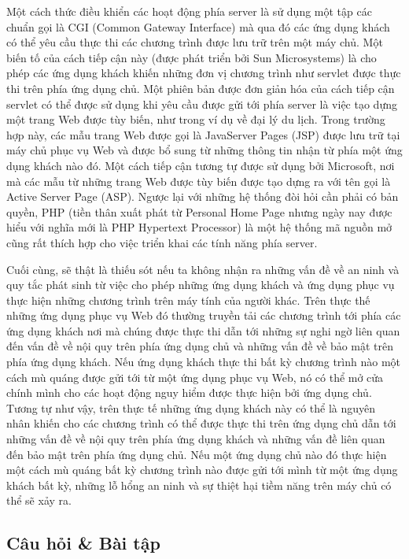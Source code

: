Một cách thức điều khiển các hoạt động phía server là sử dụng một tập các chuẩn gọi là CGI
(Common Gateway Interface) mà qua đó các ứng dụng khách có thể yêu cầu thực thi các chương
trình được lưu trữ trên một máy chủ. Một biến tố của cách tiếp cận này (được phát triển
bởi Sun Microsystems) là cho phép các ứng dụng khách khiến  những đơn vị chương trình
như servlet được thực thi trên phía ứng dụng chủ. Một phiên bản được đơn giản hóa của cách
tiếp cận servlet có thể được sử dụng khi yêu cầu được gửi tới phía server là việc tạo dựng
một trang Web được tùy biến, như trong ví dụ về đại lý du lịch. Trong trường hợp này, các
mẫu trang Web được gọi là JavaServer Pages (JSP) được lưu trữ tại máy chủ phục vụ Web và
được bổ sung từ những thông tin nhận từ phía một ứng dụng khách nào đó. Một cách tiếp cận
tương tự được sử dụng bởi Microsoft, nơi mà các mẫu từ những trang Web được tùy biến được
tạo dựng ra với tên gọi là Active Server Page (ASP). Ngược lại với những hệ thống đòi hỏi
cần phải có bản quyền, PHP (tiền thân xuất phát từ Personal Home Page nhưng ngày nay được
hiểu với nghĩa mới là PHP Hypertext Processor) là một hệ thống mã nguồn mở cũng rất thích hợp cho việc triển
khai các tính năng phía server.

Cuối cùng, sẽ thật là thiếu sót nếu ta không nhận ra những vấn đề về an ninh và 
quy tắc phát sinh từ việc cho phép những ứng dụng khách và ứng dụng phục vụ thực hiện những
chương trình trên máy tính của người khác. Trên thực thế những ứng dụng phục vụ Web đó
thường truyền tải các chương trình tới phía các ứng dụng khách nơi mà chúng được thực thi
dẫn tới những sự nghi ngờ liên quan đến vấn đề về nội quy trên phía ứng dụng chủ và những
vấn đề về bảo mật trên phía ứng dụng khách. Nếu ứng dụng khách thực thi bất kỳ chương
trình nào một cách mù quáng được gửi tới từ một ứng dụng phục vụ Web, nó có thể mở cửa
chính mình cho các hoạt động nguy hiểm được thực hiện bởi ứng dụng chủ. Tương tự như vậy,
trên thực tế những ứng dụng khách này có thể là nguyên nhân khiến cho các chương trình có
thể được thực thi trên ứng dụng chủ dẫn tới những vấn đề về nội quy trên phía ứng dụng
khách và những vấn đề liên quan đến bảo mật trên phía ứng dụng chủ. Nếu một ứng dụng chủ
nào đó thực hiện một cách mù quáng bất kỳ chương trình nào được gửi tới mình từ một ứng
dụng khách bất kỳ, những lỗ hổng an ninh và sự thiệt hại tiềm năng trên máy chủ có thể sẽ
xảy ra.

\subsection*{Câu hỏi \& Bài tập}

